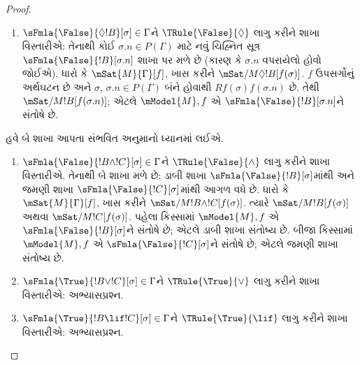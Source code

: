 \begin{proof}
\begin{enumerate}
  $\mSat{M}{\Diamond !B}[f(\sigma)]$ હોવાથી એવું $w \in W$
  છે કે $Rf(\sigma)w$ અને $\mSat{M}{!B}[w]$. $f'$ એ $f$
  જેવું જ રાખો, માત્ર $f'(\sigma.n) = w$.
  $f'(\sigma) = f(\sigma)$ અને $Rf(\sigma)w$ હોવાથી
  $Rf'(\sigma)f'(\sigma.n)$; તેથી $f'$ એ
  $P(\Gamma) \cup \{\sigma.n\}$નું અર્થઘટન છે. સ્પષ્ટ છે કે
  $\mSat{M}{!B}[f'(\sigma.n)]$. બધા ઉપસર્ગ
  $\sigma' \in P(\Gamma)$ માટે $f(\sigma') = f'(\sigma')$
  હોવાથી $\mSat{M}{\Gamma}[f']$. આમ $\mModel{M}, f'$ એ
  $\Gamma \cup \{\sFmla{\True}{!B}[\sigma.n]\}$ને સંતોષે છે.
\item $\sFmla{\False}{\Diamond !B}[\sigma] \in \Gamma$ને
  $\TRule{\False}{\Diamond}$ લાગુ કરીને શાખા વિસ્તારીએ:
  તેનાથી કોઈ
    $\sigma.n \in P(\Gamma)$ માટે નવું ચિહ્નિત સૂત્ર~$\sFmla{\False}{!B}[\sigma.n]$ શાખા પર મળે છે
    (કારણ કે $\sigma.n$ વપરાયેલો હોવો જોઈએ). ધારો કે
    $\mSat{M}{\Gamma}[f]$, ખાસ કરીને
    $\mSat/{M}{\Diamond !B}[f(\sigma)]$. $f$ ઉપસર્ગોનું
    અર્થઘટન છે અને $\sigma$, $\sigma.n \in P(\Gamma)$ બંને
    હોવાથી $Rf(\sigma)f(\sigma.n)$ છે. તેથી
    $\mSat/{M}{!B}[f(\sigma.n)]$; એટલે $\mModel{M}, f$ એ
    $\sFmla{\False}{!B}[\sigma.n]$ને સંતોષે છે.
\end{enumerate}
હવે બે શાખા આપતા સંભવિત અનુમાનો ધ્યાનમાં લઈએ.
\begin{enumerate}
\item $\sFmla{\False}{!B \land !C}[\sigma] \in \Gamma$ને
  $\TRule{\False}{\land}$ લાગુ કરીને શાખા વિસ્તારીએ. તેનાથી
  બે શાખા મળે છે: ડાબી શાખા $\sFmla{\False}{!B}[\sigma]$માંથી
  અને જમણી શાખા $\sFmla{\False}{!C}[\sigma]$માંથી આગળ વધે છે.
  ધારો કે $\mSat{M}{\Gamma}[f]$, ખાસ કરીને
  $\mSat/{M}{!B \land !C}[f(\sigma)]$. ત્યારે
  $\mSat/{M}{!B}[f(\sigma)]$ અથવા
  $\mSat/{M}{!C}[f(\sigma)]$. પહેલા કિસ્સામાં
  $\mModel{M}, f$ એ $\sFmla{\False}{!B}[\sigma]$ને સંતોષે છે;
  એટલે ડાબી શાખા સંતોષ્ય છે. બીજા કિસ્સામાં
  $\mModel{M}, f$ એ $\sFmla{\False}{!C}[\sigma]$ને સંતોષે છે;
  એટલે જમણી શાખા સંતોષ્ય છે.
\item $\sFmla{\True}{!B \lor !C}[\sigma] \in \Gamma$ને
    $\TRule{\True}{\lor}$ લાગુ કરીને શાખા વિસ્તારીએ:
    અભ્યાસપ્રશ્ન.
\item $\sFmla{\True}{!B \lif !C}[\sigma] \in \Gamma$ને
    $\TRule{\True}{\lif}$ લાગુ કરીને શાખા વિસ્તારીએ:
    અભ્યાસપ્રશ્ન.
\end{enumerate}
\end{proof}

